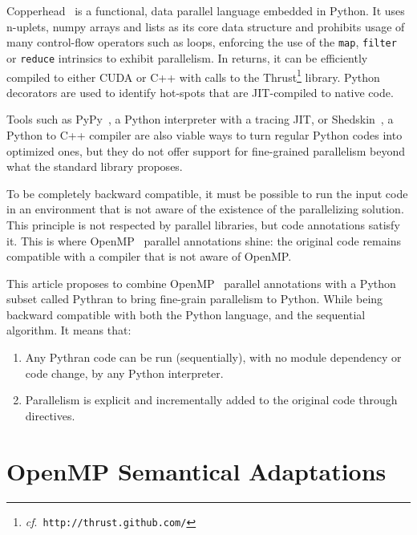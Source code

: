 \documentclass{llncs}
\begin{document}
Copperhead~\cite{copperhead2011} is a functional, data parallel language embedded in
Python. It uses n-uplets, numpy arrays and lists as its core data structure and
prohibits usage of many control-flow operators such as loops, enforcing the use
of the \texttt{map}, \texttt{filter} or \texttt{reduce} intrinsics to exhibit
parallelism. In returns, it can be efficiently compiled to either CUDA or C++
with calls to the Thrust\footnote{\emph{cf}.\
\texttt{http://thrust.github.com/}} library. Python decorators are used to
identify hot-spots that are JIT-compiled to native code.

Tools such as PyPy~\cite{pypy2009}, a Python interpreter with a tracing JIT, or
Shedskin~\cite{shedskin2006}, a Python to C++ compiler are also viable ways to
turn regular Python codes into optimized ones, but they do not offer support for
fine-grained parallelism beyond what the standard library proposes.

To be completely backward compatible, it must be possible to run the input code
in an environment that is not aware of the existence of the parallelizing
solution. This principle is not respected by parallel libraries, but code
annotations satisfy it. This is where OpenMP~\cite{openmp3.1} parallel
annotations shine: the original code remains compatible with a compiler that is
not aware of OpenMP.

This article proposes to combine OpenMP~\cite{openmp3.1} parallel annotations
with a Python subset called Pythran to bring fine-grain parallelism to Python.
While being backward compatible with both the Python language, and the
sequential algorithm. It means that:
%
\begin{enumerate}
    \item Any Pythran code can be run (sequentially), with no module dependency
        or code change, by any Python interpreter.
    \item Parallelism is explicit and incrementally added to the original code
        through directives.
\end{enumerate}

\section{OpenMP Semantical Adaptations}\label{sec:python-openmp}
\end{document}

